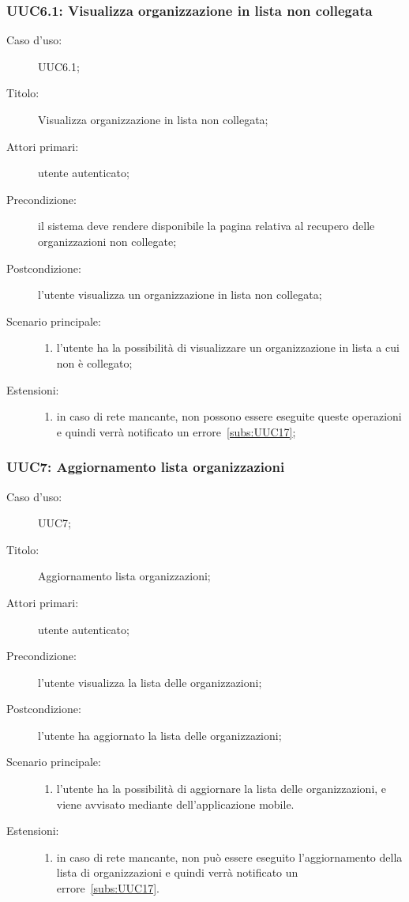 \documentclass[../../../analisi-dei-requisiti.tex]{subfiles}
\begin{document}
\subsubsection{UUC6.1: Visualizza organizzazione in lista non collegata}%
\label{subs:UUC6.1}
\begin{description}
  \item[Caso d’uso:] UUC6.1;
  \item[Titolo:] Visualizza organizzazione in lista non collegata;
  \item[Attori primari:] utente autenticato;
  \item[Precondizione:] il sistema deve rendere disponibile la pagina relativa al recupero delle organizzazioni non collegate;
  \item[Postcondizione:] l'utente visualizza un organizzazione in lista non collegata;
  \item[Scenario principale:]
        \begin{enumerate}
          \item l'utente ha la possibilità di visualizzare un organizzazione in lista a cui non è collegato;
        \end{enumerate}
  \item[Estensioni:]
        \begin{enumerate}
          \item in caso di rete mancante, non possono essere eseguite queste operazioni e quindi verrà notificato un errore~\ref{subs:UUC17};
        \end{enumerate}
\end{description}

\subsubsection{UUC7: Aggiornamento lista organizzazioni}%
\label{subs:UUC7}
\begin{description}
  \item[Caso d’uso:] UUC7;
  \item[Titolo:] Aggiornamento lista organizzazioni;
  \item[Attori primari:] utente autenticato;
  \item[Precondizione:] l'utente visualizza la lista delle organizzazioni;
  \item[Postcondizione:] l'utente ha aggiornato la lista delle organizzazioni;
  \item[Scenario principale:]
        \begin{enumerate}
          \item l'utente ha la possibilità di aggiornare la lista delle organizzazioni, e viene avvisato mediante  dell'applicazione mobile.
        \end{enumerate}
  \item[Estensioni:]
        \begin{enumerate}
          \item in caso di rete mancante, non può essere eseguito l'aggiornamento della lista di organizzazioni e quindi verrà notificato un errore~\ref{subs:UUC17}.
        \end{enumerate}
\end{description}
\end{document}
